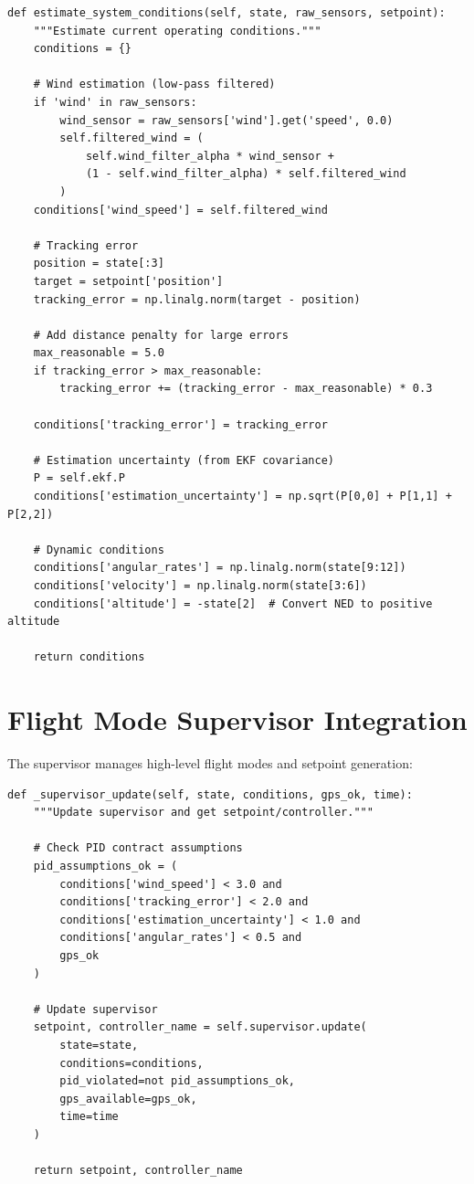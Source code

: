 \begin{lstlisting}[caption={Condition estimation method}]
def estimate_system_conditions(self, state, raw_sensors, setpoint):
    """Estimate current operating conditions."""
    conditions = {}

    # Wind estimation (low-pass filtered)
    if 'wind' in raw_sensors:
        wind_sensor = raw_sensors['wind'].get('speed', 0.0)
        self.filtered_wind = (
            self.wind_filter_alpha * wind_sensor +
            (1 - self.wind_filter_alpha) * self.filtered_wind
        )
    conditions['wind_speed'] = self.filtered_wind

    # Tracking error
    position = state[:3]
    target = setpoint['position']
    tracking_error = np.linalg.norm(target - position)

    # Add distance penalty for large errors
    max_reasonable = 5.0
    if tracking_error > max_reasonable:
        tracking_error += (tracking_error - max_reasonable) * 0.3

    conditions['tracking_error'] = tracking_error

    # Estimation uncertainty (from EKF covariance)
    P = self.ekf.P
    conditions['estimation_uncertainty'] = np.sqrt(P[0,0] + P[1,1] + P[2,2])

    # Dynamic conditions
    conditions['angular_rates'] = np.linalg.norm(state[9:12])
    conditions['velocity'] = np.linalg.norm(state[3:6])
    conditions['altitude'] = -state[2]  # Convert NED to positive altitude

    return conditions
\end{lstlisting}

\section{Flight Mode Supervisor Integration}

The supervisor manages high-level flight modes and setpoint generation:

\begin{lstlisting}[caption={Flight mode supervisor update}]
def _supervisor_update(self, state, conditions, gps_ok, time):
    """Update supervisor and get setpoint/controller."""

    # Check PID contract assumptions
    pid_assumptions_ok = (
        conditions['wind_speed'] < 3.0 and
        conditions['tracking_error'] < 2.0 and
        conditions['estimation_uncertainty'] < 1.0 and
        conditions['angular_rates'] < 0.5 and
        gps_ok
    )

    # Update supervisor
    setpoint, controller_name = self.supervisor.update(
        state=state,
        conditions=conditions,
        pid_violated=not pid_assumptions_ok,
        gps_available=gps_ok,
        time=time
    )

    return setpoint, controller_name
\end{lstlisting}

